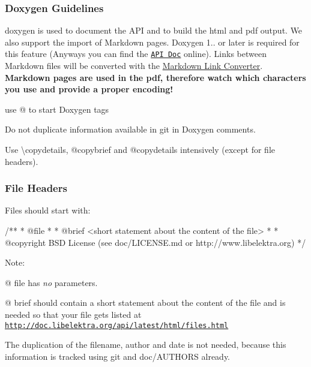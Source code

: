 \subsubsection*{Doxygen Guidelines}

{\ttfamily doxygen} is used to document the A\+P\+I and to build the html and pdf output. We also support the import of Markdown pages. Doxygen 1.. or later is required for this feature (Anyways you can find the \href{http://doc.libelektra.org/api/latest/html/}{\tt A\+P\+I Doc} online). Links between Markdown files will be converted with the \hyperlink{doc_markdownlinkconverter_README_md}{Markdown Link Converter}. {\bfseries Markdown pages are used in the pdf, therefore watch which characters you use and provide a proper encoding!}


\begin{DoxyItemize}
\item use {\ttfamily @} to start Doxygen tags
\item Do not duplicate information available in git in Doxygen comments.
\item Use {\ttfamily \textbackslash{}copydetails}, {\ttfamily @copybrief} and {\ttfamily @copydetails} intensively (except for file headers).
\end{DoxyItemize}

\subsubsection*{File Headers}

Files should start with\+:

\begin{DoxyVerb}        /**
         * @file
         *
         * @brief <short statement about the content of the file>
         *
         * @copyright BSD License (see doc/LICENSE.md or http://www.libelektra.org)
         */\end{DoxyVerb}


Note\+:


\begin{DoxyItemize}
\item {\ttfamily @} {\ttfamily file} has {\itshape no} parameters.
\item {\ttfamily @} {\ttfamily brief} should contain a short statement about the content of the file and is needed so that your file gets listed at \href{http://doc.libelektra.org/api/latest/html/files.html}{\tt http\+://doc.\+libelektra.\+org/api/latest/html/files.\+html}
\end{DoxyItemize}

The duplication of the filename, author and date is not needed, because this information is tracked using git and doc/\+A\+U\+T\+H\+O\+R\+S already. 